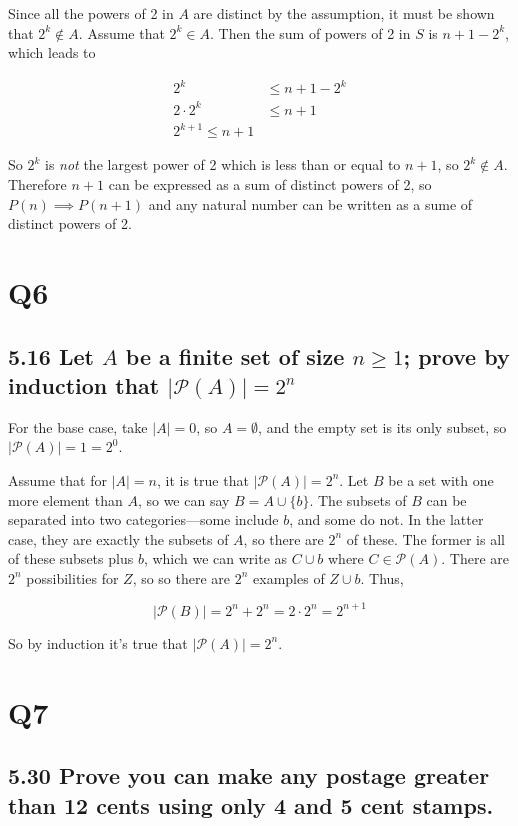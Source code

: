 \documentclass{article}
\begin{document}
Since all the powers of 2 in $A$ are distinct by the assumption, it must be shown that $2^k \notin A$. Assume that $2^k \in A$. Then the sum of powers of 2 in $S$ is $n + 1 - 2^k$, which leads to

\begin{align*}
  2^k &\leq n + 1 - 2^k \\
  2\cdot 2^k &\leq n + 1 \\
  2^{k+1} \leq n+1
\end{align*}

So $2^k$ is \textit{not} the largest power of 2 which is less than or equal to $n+1$, so $2^k \notin A$. Therefore $n+1$ can be expressed as a sum of distinct powers of 2, so $P(n) \implies P(n+1)$ and any natural number can be written as a sume of distinct powers of 2.


\section*{Q6}
\subsection*{5.16 \normalsize Let $A$ be a finite set of size $n \geq 1$; prove by induction that $|\mathscr{P}(A)| = 2^n$}

For the base case, take $|A| = 0$, so $A = \emptyset$, and the empty set is its only subset, so $|\mathscr{P}(A)| = 1 = 2^0$.

Assume that for $|A| = n$, it is true that $|\mathscr{P}(A)| = 2^n$. Let $B$ be a set with one more element than $A$, so we can say $B = A \cup \{b\}$. The subsets of $B$ can be separated into two categories---some include $b$, and some do not. In the latter case, they are exactly the subsets of $A$, so there are $2^n$ of these. The former is all of these subsets plus $b$, which we can write as $C \cup {b}$ where $C \in \mathscr{P}(A)$. There are $2^n$ possibilities for $Z$, so so there are $2^n$ examples of $Z \cup {b}$. Thus,

$$|\mathscr{P}(B)| = 2^n + 2^n = 2\cdot 2^n = 2^{n+1}$$

So by induction it's true that $|\mathscr{P}(A)| = 2^n$.


\section*{Q7} %
\subsection*{5.30 \normalsize Prove you can make any postage greater than 12 cents using only 4 and 5 cent stamps.}
\end{document}
